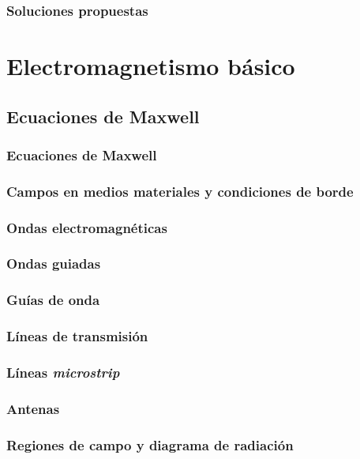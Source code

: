 \documentclass{beamer}
\begin{document}
		\begin{frame}
		\frametitle{Soluciones propuestas}
		\end{frame}

\section{Electromagnetismo básico}

	\subsection{Ecuaciones de Maxwell} %
	
		\begin{frame}
		\frametitle{Ecuaciones de Maxwell}
		\end{frame}
		
		\begin{frame}
		\frametitle{Campos en medios materiales y condiciones de borde}
		\end{frame}
		
		\begin{frame}
		\frametitle{Ondas electromagnéticas}
		\end{frame}
		
		\subsubsection{Ondas guiadas}
		
			\begin{frame}
			\frametitle{Guías de onda}
			\end{frame}
	
			\begin{frame}
			\frametitle{Líneas de transmisión}
			\end{frame}
		
			\begin{frame}
			\frametitle{Líneas \textit{microstrip}}
			\end{frame}
		
		\subsubsection{Antenas}
		
			\begin{frame}
			\frametitle{Regiones de campo y diagrama de radiación}
			\end{frame}
		
\end{document}
